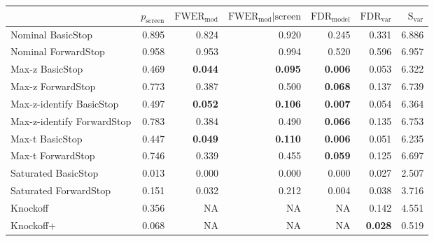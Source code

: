 
\newcommand{\guarantee}[1]{{\bf #1}}
\begin{tabular}{|l|rrrrrr|}
 \hline
{} &  $p_{\text{screen}}$ &  $\text{FWER}_{\text{mod}}$ &  $\text{FWER}_{\text{mod}} \vert \text{screen}$ &  $\text{FDR}_{\text{model}}$ &  $\text{FDR}_{\text{var}}$ &  $\text{S}_{\text{var}}$ \\ \hline
Nominal BasicStop & 0.895 & 0.824 & 0.920 & 0.245 & 0.331 & 6.886 \\ 
Nominal ForwardStop & 0.958 & 0.953 & 0.994 & 0.520 & 0.596 & 6.957 \\ 
Max-z BasicStop & 0.469 & \guarantee{0.044} & \guarantee{0.095} & \guarantee{0.006} & 0.053 & 6.322 \\ 
Max-z ForwardStop & 0.773 & 0.387 & 0.500 & \guarantee{0.068} & 0.137 & 6.739 \\ 
Max-z-identify BasicStop & 0.497 & \guarantee{0.052} & \guarantee{0.106} & \guarantee{0.007} & 0.054 & 6.364 \\ 
Max-z-identify ForwardStop & 0.783 & 0.384 & 0.490 & \guarantee{0.066} & 0.135 & 6.753 \\ 
Max-t BasicStop & 0.447 & \guarantee{0.049} & \guarantee{0.110} & \guarantee{0.006} & 0.051 & 6.235 \\ 
Max-t ForwardStop & 0.746 & 0.339 & 0.455 & \guarantee{0.059} & 0.125 & 6.697 \\ 
Saturated BasicStop & 0.013 & 0.000 & 0.000 & 0.000 & 0.027 & 2.507 \\ 
Saturated ForwardStop & 0.151 & 0.032 & 0.212 & 0.004 & 0.038 & 3.716 \\ 
Knockoff & 0.356 & NA & NA & NA & 0.142 & 4.551 \\ 
Knockoff+ & 0.068 & NA & NA & NA & \guarantee{0.028} & 0.519 \\   \hline
\end{tabular}